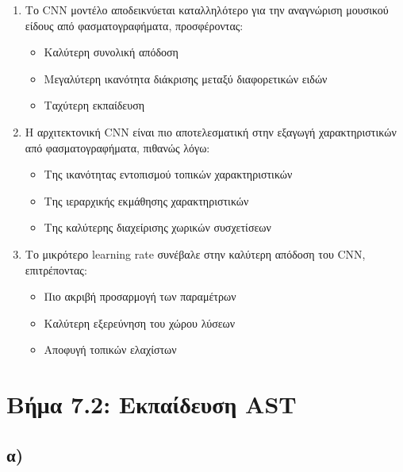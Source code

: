 \documentclass[a4paper,12pt]{article}
\begin{document}
\begin{enumerate}
    \item Το CNN μοντέλο αποδεικνύεται καταλληλότερο για την αναγνώριση μουσικού είδους από φασματογραφήματα, προσφέροντας:
    \begin{itemize}
        \item Καλύτερη συνολική απόδοση
        \item Μεγαλύτερη ικανότητα διάκρισης μεταξύ διαφορετικών ειδών
        \item Ταχύτερη εκπαίδευση
    \end{itemize}
    
    \item Η αρχιτεκτονική CNN είναι πιο αποτελεσματική στην εξαγωγή χαρακτηριστικών από φασματογραφήματα, πιθανώς λόγω:
    \begin{itemize}
        \item Της ικανότητας εντοπισμού τοπικών χαρακτηριστικών
        \item Της ιεραρχικής εκμάθησης χαρακτηριστικών
        \item Της καλύτερης διαχείρισης χωρικών συσχετίσεων
    \end{itemize}
    
    \item Το μικρότερο learning rate συνέβαλε στην καλύτερη απόδοση του CNN, επιτρέποντας:
    \begin{itemize}
        \item Πιο ακριβή προσαρμογή των παραμέτρων
        \item Καλύτερη εξερεύνηση του χώρου λύσεων
        \item Αποφυγή τοπικών ελαχίστων
    \end{itemize}
\end{enumerate}

\section*{Βήμα 7.2: Εκπαίδευση AST}

\subsection*{α)}
\end{document}
